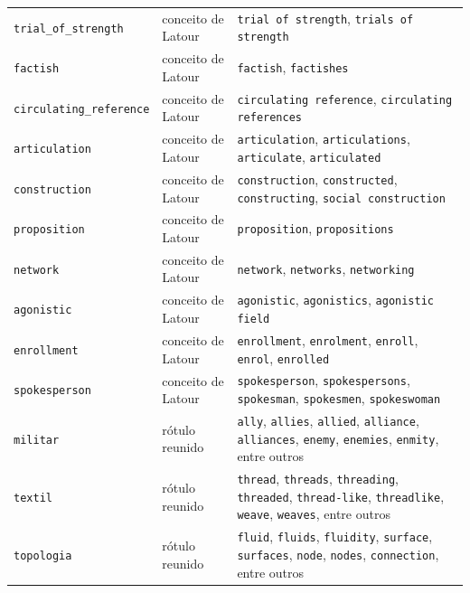 \begin{longtable}{@{}p{} p{} p{}@{}}
\texttt{trial\_of\_strength} & conceito de Latour & \texttt{trial of strength}, \texttt{trials of strength} \\
\texttt{factish} & conceito de Latour & \texttt{factish}, \texttt{factishes} \\
\texttt{circulating\_reference} & conceito de Latour & \texttt{circulating reference}, \texttt{circulating references} \\
\texttt{articulation} & conceito de Latour & \texttt{articulation}, \texttt{articulations}, \texttt{articulate}, \texttt{articulated} \\
\texttt{construction} & conceito de Latour & \texttt{construction}, \texttt{constructed}, \texttt{constructing}, \texttt{social construction} \\
\texttt{proposition} & conceito de Latour & \texttt{proposition}, \texttt{propositions} \\
\texttt{network} & conceito de Latour & \texttt{network}, \texttt{networks}, \texttt{networking} \\
\texttt{agonistic} & conceito de Latour & \texttt{agonistic}, \texttt{agonistics}, \texttt{agonistic field} \\
\texttt{enrollment} & conceito de Latour & \texttt{enrollment}, \texttt{enrolment}, \texttt{enroll}, \texttt{enrol}, \texttt{enrolled} \\
\texttt{spokesperson} & conceito de Latour & \texttt{spokesperson}, \texttt{spokespersons}, \texttt{spokesman}, \texttt{spokesmen}, \texttt{spokeswoman} \\
\texttt{militar} & rótulo reunido & \texttt{ally}, \texttt{allies}, \texttt{allied}, \texttt{alliance}, \texttt{alliances}, \texttt{enemy}, \texttt{enemies}, \texttt{enmity}, entre outros \\
\texttt{textil} & rótulo reunido & \texttt{thread}, \texttt{threads}, \texttt{threading}, \texttt{threaded}, \texttt{thread-like}, \texttt{threadlike}, \texttt{weave}, \texttt{weaves}, entre outros \\
\texttt{topologia} & rótulo reunido & \texttt{fluid}, \texttt{fluids}, \texttt{fluidity}, \texttt{surface}, \texttt{surfaces}, \texttt{node}, \texttt{nodes}, \texttt{connection}, entre outros \\
\end{longtable}

